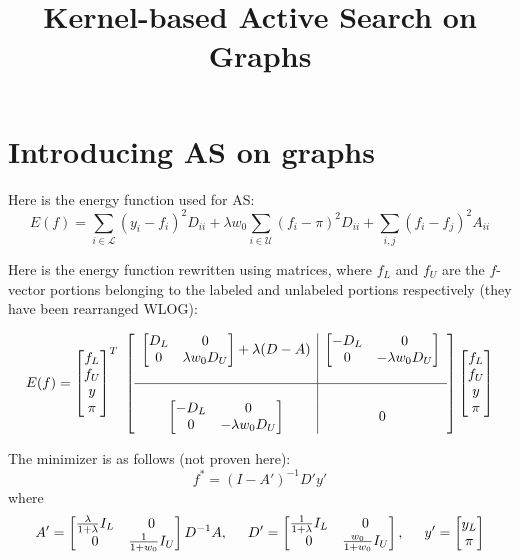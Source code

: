 \documentclass[12pt]{article}
\title{Kernel-based Active Search on Graphs}
\date{\vspace{-10ex}}
\renewcommand{\L}{\mathcal{L}}
\newcommand{\U}{\mathcal{U}}
\newcommand{\inv}[1]{#1^{-1}}
\begin{document}
\maketitle

\section{Introducing AS on graphs}

Here is the energy function used for AS:
$$E(f) = \sum\limits_{i \in \L} (y_i-f_i)^2 D_{ii} + \lambda w_0 \sum\limits_{i \in \U} (f_i-\pi)^2 D_{ii} + \sum\limits_{i,j} (f_i-f_j)^2 A_{ii}$$

Here is the energy function rewritten using matrices, where $f_L$ and $f_U$ are the $f$-vector portions belonging to the labeled and unlabeled portions respectively (they have been rearranged WLOG):

$$E(f) = \left[\begin{matrix} f_L \\ f_U \\ y \\ \pi \end{matrix}\right]^T \
		 \left[\begin{array}{c|c}
		 	\left[\begin{matrix} D_L & 0 \\ 0&\lambda w_0 D_U\end{matrix}\right] + \lambda(D-A) & 
		 	\left[\begin{matrix} -D_L & 0 \\ 0&-\lambda w_0 D_U\end{matrix}\right] 
		 	\\\\ \hline \\ 
		 	\left[\begin{matrix} -D_L & 0 \\ 0&-\lambda w_0 D_U\end{matrix}\right] & 
		 	0
		 	\end{array}\right] 
		 \left[\begin{matrix} f_L \\ f_U \\ y \\ \pi \end{matrix}\right]
$$

The minimizer is as follows (not proven here): $$f^* = \inv{(I-A')} D' y'$$
where 
$$A' = \left[\begin{matrix} \frac{\lambda}{1+\lambda}I_L & 0 \\ 0 & \frac{1}{1+w_0}I_U \end{matrix}\right] \inv{D} A,\hspace{5mm}
  D' = \left[\begin{matrix} \frac{1}{1+\lambda}I_L & 0 \\ 0 & \frac{w_0}{1+w_0}I_U \end{matrix}\right],\hspace{5mm}
  y' = \left[\begin{matrix} y_L \\ \pi \end{matrix} \right]
$$
\end{document}
